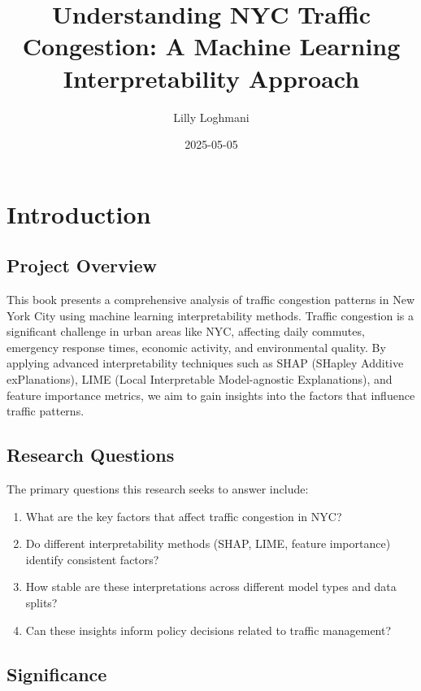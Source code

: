 \documentclass[
  letterpaper,
  DIV=11,
  numbers=noendperiod]{scrreprt}
\title{Understanding NYC Traffic Congestion: A Machine Learning
Interpretability Approach}
\author{Lilly Loghmani}
\date{2025-05-05}
\providecommand{\tightlist}{%
  \setlength{\itemsep}{0pt}\setlength{\parskip}{0pt}}\usepackage{longtable,booktabs,array}
\renewcommand*\contentsname{Table of contents}
\newcommand\contentsname{Table of contents}
\begin{document}
\maketitle

\renewcommand*\contentsname{Table of contents}
{
\hypersetup{linkcolor=}
\setcounter{tocdepth}{2}
\tableofcontents
}

\chapter{Introduction}\label{introduction}

\section{Project Overview}\label{project-overview}

This book presents a comprehensive analysis of traffic congestion
patterns in New York City using machine learning interpretability
methods. Traffic congestion is a significant challenge in urban areas
like NYC, affecting daily commutes, emergency response times, economic
activity, and environmental quality. By applying advanced
interpretability techniques such as SHAP (SHapley Additive
exPlanations), LIME (Local Interpretable Model-agnostic Explanations),
and feature importance metrics, we aim to gain insights into the factors
that influence traffic patterns.

\section{Research Questions}\label{research-questions}

The primary questions this research seeks to answer include:

\begin{enumerate}
\def\labelenumi{\arabic{enumi}.}
\tightlist
\item
  What are the key factors that affect traffic congestion in NYC?
\item
  Do different interpretability methods (SHAP, LIME, feature importance)
  identify consistent factors?
\item
  How stable are these interpretations across different model types and
  data splits?
\item
  Can these insights inform policy decisions related to traffic
  management?
\end{enumerate}

\section{Significance}\label{significance}
\end{document}
